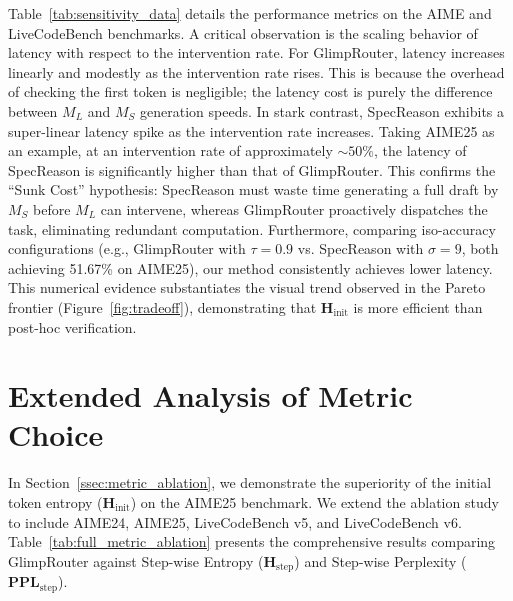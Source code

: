 \documentclass[11pt]{article}
\newcommand{\approach}{{GlimpRouter}\xspace}
\begin{document}
Table~\ref{tab:sensitivity_data} details the performance metrics on the AIME and LiveCodeBench benchmarks.
A critical observation is the scaling behavior of latency with respect to the intervention rate.
For \approach, latency increases linearly and modestly as the intervention rate rises. This is because the overhead of checking the first token is negligible; the latency cost is purely the difference between $M_L$ and $M_S$ generation speeds.
In stark contrast, SpecReason exhibits a super-linear latency spike as the intervention rate increases. Taking AIME25 as an example, at an intervention rate of approximately $\sim 50\%$, the latency of SpecReason is significantly higher than that of \approach. This confirms the ``Sunk Cost'' hypothesis: SpecReason must waste time generating a full draft by $M_S$ before $M_L$ can intervene, whereas \approach proactively dispatches the task, eliminating redundant computation.
Furthermore, comparing iso-accuracy configurations (e.g., \approach with \textbf{$\tau=0.9$} vs. SpecReason with \textbf{$\sigma=9$}, both achieving 51.67\% on AIME25), our method consistently achieves lower latency. This numerical evidence substantiates the visual trend observed in the Pareto frontier (Figure~\ref{fig:tradeoff}), demonstrating that $\mathbf{H}_\text{init}$ is more efficient than post-hoc verification.










\section{Extended Analysis of Metric Choice}
\label{app:metric_ablation}

In Section~\ref{ssec:metric_ablation}, we demonstrate the superiority of the initial token entropy ($\mathbf{H}_\text{init}$) on the AIME25 benchmark. We extend the ablation study to include AIME24, AIME25, LiveCodeBench v5, and LiveCodeBench v6.
Table~\ref{tab:full_metric_ablation} presents the comprehensive results comparing \approach against Step-wise Entropy ($\mathbf{H}_\text{step}$) and Step-wise Perplexity ($\mathbf{PPL}_\text{step}$).
\end{document}
